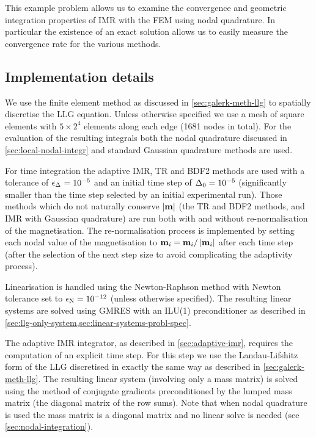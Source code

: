This example problem allows us to examine the convergence and geometric integration properties of IMR with the FEM using nodal quadrature.
In particular the existence of an exact solution allows us to easily measure the convergence rate for the various methods.


\subsection{Implementation details}
\label{sec:impl-deta}

We use the finite element method as discussed in \cref{sec:galerk-meth-llg} to spatially discretise the LLG equation.
Unless otherwise specified we use a mesh of square elements with $5 \times 2^4$ elements along each edge (1681 nodes in total).
For the evaluation of the resulting integrals both the nodal quadrature discussed in \cref{sec:local-nodal-integr} and standard Gaussian quadrature methods are used.

For time integration the adaptive IMR, TR and BDF2 methods are used with a tolerance of $\epsilon_{\Delta_{}} = 10^{-5}$ and an initial time step of $\Delta_{0} = 10^{-5}$ (significantly smaller than the time step selected by an initial experimental run).
Those methods which do not naturally conserve $\left|{\boldsymbol{\mathrm{m}}} \right|$ (the TR and BDF2 methods, and IMR with Gaussian quadrature) are run both with and without re-normalisation of the magnetisation.
The re-normalisation process is implemented by setting each nodal value of the magnetisation to $\boldsymbol{\mathrm{m}}_i = \boldsymbol{\mathrm{m}}_i/\left|{\boldsymbol{\mathrm{m}}_i} \right|$ after each time step (after the selection of the next step size to avoid complicating the adaptivity process).

Linearisation is handled using the Newton-Raphson method with Newton tolerance set to $\epsilon_{\mathrm{N}} = 10^{-12}$ (unless otherwise specified).
The resulting linear systems are solved using GMRES with an ILU(1) preconditioner as described in \cref{sec:llg-only-system,sec:linear-systems-probl-spec}.

The adaptive IMR integrator, as described in \cref{sec:adaptive-imr}, requires the computation of an explicit time step.
For this step we use the Landau-Lifshitz form of the LLG discretised in exactly the same way as described in \cref{sec:galerk-meth-llg}.
The resulting linear system (involving only a mass matrix) is solved using the method of conjugate gradients preconditioned by the lumped mass matrix (\ie the diagonal matrix of the row sums).
Note that when nodal quadrature is used the mass matrix is a diagonal matrix and no linear solve is needed (see \cref{sec:nodal-integration}).


